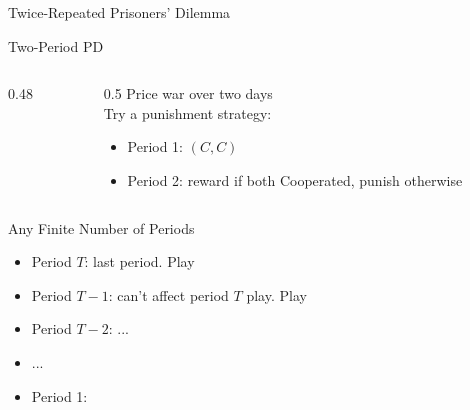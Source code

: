
\begin{frame}[standout]
Twice-Repeated Prisoners' Dilemma
\end{frame}

\begin{frame}{Two-Period PD}
\begin{columns}[T]
\begin{column}{0.48\textwidth}
\centering
\pdgame
\end{column}
\begin{column}{0.5\textwidth}
Price war over two days\\[6pt]
Try a punishment strategy:
\begin{itemize}
    \item Period 1: $(C,C)$
    \item Period 2: reward if both Cooperated, punish otherwise
\end{itemize}
\bsk
{}
\end{column}
\end{columns}
\bsk
{}
\vspace{-0.3in}
\end{frame}

\begin{frame}{Any Finite Number of Periods}
\begin{itemize}
    \item Period $T$: last period. Play \underline{\hspace{0.9in}}
    \item Period $T-1$: can't affect period $T$ play. Play \underline{\hspace{0.9in}}
    \item Period $T-2$: ...
    \item ...
    \item Period 1: \underline{\hspace{0.9in}}
\end{itemize}
\bsk
{}
\bsk
{}
\vspace{-0.3in}
\end{frame}


